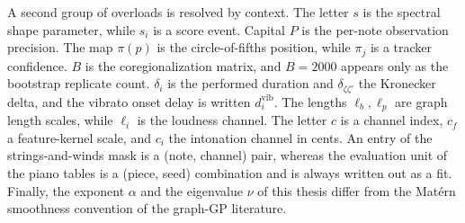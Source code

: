 A second group of overloads is resolved by context. The letter $s$ is the
spectral shape parameter, while $s_i$ is a score event. Capital $P$ is the
per-note observation precision. The map $\pi(p)$ is the circle-of-fifths
position, while $\pi_j$ is a tracker confidence. $B$ is the
coregionalization matrix, and $B = 2000$ appears only as the bootstrap
replicate count. $\delta_i$ is the performed duration and
$\delta_{\zeta\zeta'}$ the Kronecker delta, and the vibrato onset delay is
written $d_i^{\mathrm{vib}}$. The lengths $\ell_b, \ell_p$ are graph length
scales, while $\ell_i$ is the loudness channel. The letter $c$ is a channel
index, $c_f$ a feature-kernel scale, and $c_i$ the intonation channel in
cents. An entry of the strings-and-winds mask is a (note, channel) pair,
whereas the evaluation unit of the piano tables is a (piece, seed)
combination and is always written out as a fit. Finally, the exponent
$\alpha$ and the eigenvalue $\nu$ of this thesis differ from the Mat\'ern
smoothness convention of the graph-GP literature.

